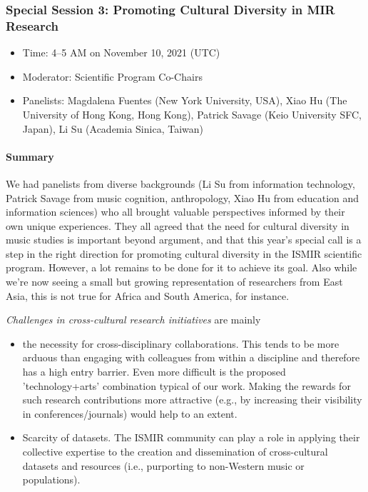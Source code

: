 \documentclass[%
10pt,								%
titlepage,						%
]
{scrartcl}
\begin{document}
        \subsubsection{Special Session 3: Promoting Cultural Diversity in MIR Research}
            \begin{itemize}
                \item   Time: 4--5 AM on November 10, 2021 (UTC)

                \item   Moderator: Scientific Program Co-Chairs

                \item   Panelists: Magdalena Fuentes (New York University, USA), Xiao Hu (The University of Hong Kong, Hong Kong), Patrick Savage (Keio University SFC, Japan), Li Su (Academia Sinica, Taiwan)


            \end{itemize}
            
            \paragraph{Summary}
                We had panelists from diverse backgrounds (Li Su from information technology, Patrick Savage from music cognition, anthropology, Xiao Hu from education and information sciences) who all brought valuable perspectives informed by their own unique experiences. They all agreed that the need for cultural diversity in music studies is important beyond argument, and that this year's special call is a step in the right direction for promoting cultural diversity in the ISMIR scientific program. However, a lot remains to be done for it to achieve its goal. Also while we're now seeing a small but growing representation of researchers from East Asia, this is not true for Africa and South America, for instance.
                
                \textit{Challenges in cross-cultural research initiatives} are mainly
                    \begin{itemize}
                        \item   the necessity for cross-disciplinary collaborations. This tends to be more arduous than engaging with colleagues from within a discipline and therefore has a high entry barrier. Even more difficult is the proposed 'technology+arts' combination typical of our work. Making the rewards for such research contributions more attractive (e.g., by increasing their visibility in conferences/journals) would help to an extent. 
                        \item   Scarcity of datasets. The ISMIR community can play a role in applying their collective expertise to the creation and dissemination of cross-cultural datasets and resources (i.e., purporting to non-Western music or populations). 
                    \end{itemize}
                
\end{document}
